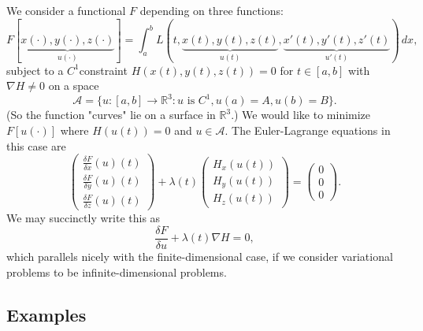 \documentclass[11pt]{book}
\newcommand{\R}{\mathbb{R}}
\begin{document}
We consider a functional $F$ depending on three functions:
\[
F[\underbrace{x(\cdot), y(\cdot), z(\cdot)}_{u(\cdot)}] = \int_a^b L(t, \underbrace{x(t), y(t), z(t)}_{u(t)}, \underbrace{x'(t), y'(t), z'(t)}_{u'(t)}) \, dx,
\]
subject to a $C^1$constraint $H(x(t),y(t),z(t)) = 0$ for $t \in [a, b]$ with $\nabla H \neq 0$ on a space 
\[
\mathcal{A} = \{ u : [a, b] \to \R^3 : u \text{ is } C^1, u(a) = A, u(b) = B \}.
\] 
(So the function "curves" lie on a surface in $\R^3$.) We would like to minimize $F[u(\cdot)]$ where $H(u(t)) = 0$ and $u \in \mathcal{A}$. The Euler-Lagrange equations in this case are
\[
\begin{pmatrix}
\frac{\delta F}{\delta x}(u)(t) \\
\frac{\delta F}{\delta y}(u)(t) \\
\frac{\delta F}{\delta z}(u)(t)
\end{pmatrix} + \lambda(t) \begin{pmatrix}
H_x(u(t)) \\
H_y(u(t)) \\
H_z(u(t))
\end{pmatrix} = \begin{pmatrix}
0 \\ 0 \\ 0
\end{pmatrix}.
\]
We may succinctly write this as
\[
\frac{\delta F}{\delta u} + \lambda (t) \nabla H = 0,
\]
which parallels nicely with the finite-dimensional case, if we consider variational problems to be infinite-dimensional problems.

\subsection{Examples}
\end{document}
